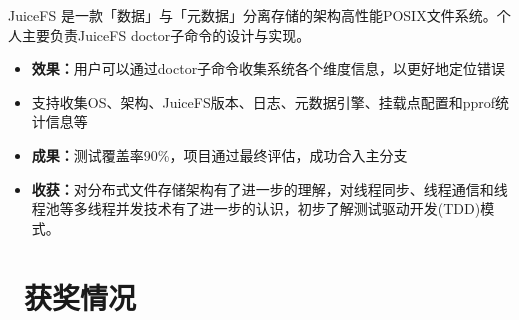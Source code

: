 \documentclass{resume}
\begin{document}
JuiceFS 是一款「数据」与「元数据」分离存储的架构高性能POSIX文件系统。个人主要负责JuiceFS doctor子命令的设计与实现。
\begin{onehalfspacing}
\begin{itemize}
  \item \textbf{效果：}用户可以通过doctor子命令收集系统各个维度信息，以更好地定位错误
  \item 支持收集OS、架构、JuiceFS版本、日志、元数据引擎、挂载点配置和pprof统计信息等
  \item \textbf{成果：}测试覆盖率90\%，项目通过最终评估，成功合入主分支
  \item \textbf{收获：}对分布式文件存储架构有了进一步的理解，对线程同步、线程通信和线程池等多线程并发技术有了进一步的认识，初步了解测试驱动开发(TDD)模式。
\end{itemize}
\end{onehalfspacing}


\section{\faHeartO\ 获奖情况}



\end{document}
